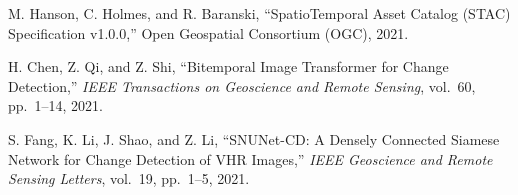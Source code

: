 \documentclass[11pt,a4paper]{article}
\begin{document}
\begin{list}{}{\setlength{\leftmargin}{1.5em}\setlength{\itemindent}{-1.5em}\setlength{\itemsep}{6pt}}
\item [10] M. Hanson, C. Holmes, and R. Baranski, ``SpatioTemporal Asset Catalog (STAC) Specification v1.0.0,'' Open Geospatial Consortium (OGC), 2021.

\item [11] H. Chen, Z. Qi, and Z. Shi, ``Bitemporal Image Transformer for Change Detection,'' \emph{IEEE Transactions on Geoscience and Remote Sensing}, vol.\ 60, pp.\ 1--14, 2021.

\item [12] S. Fang, K. Li, J. Shao, and Z. Li, ``SNUNet-CD: A Densely Connected Siamese Network for Change Detection of VHR Images,'' \emph{IEEE Geoscience and Remote Sensing Letters}, vol.\ 19, pp.\ 1--5, 2021.
\end{list}
\end{document}
